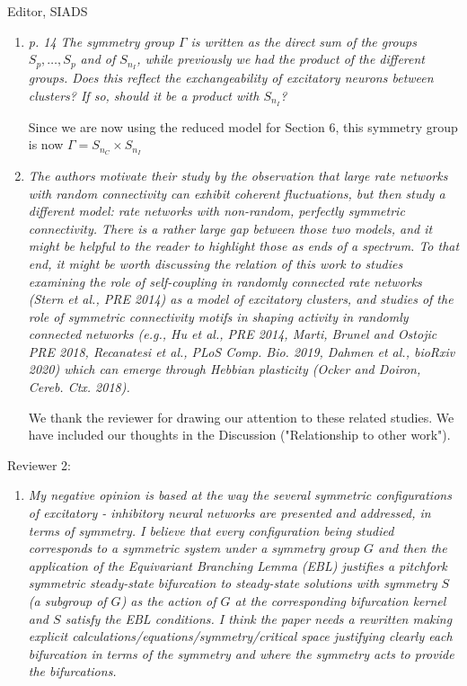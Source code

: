 \documentclass[11pt]{letter}
\begin{document}
\begin{letter}{Editor, SIADS}
\begin{enumerate}
\item \emph{p. 14 The symmetry group $\Gamma$ is written as the direct sum of the groups $S_p, \ldots, S_p$ and of $S_{n_I}$, while previously we had the product of the different groups. Does this reflect the exchangeability of excitatory neurons between clusters? If so, should it be a product with $S_{n_I}$? }

\vspace{4mm} 
Since we are now using the reduced model for Section 6, this symmetry group is now $\Gamma = S_{n_C} \times S_{n_I}$


\item \emph{The authors motivate their study by the observation that large rate networks with random connectivity can exhibit coherent fluctuations, but then study a different model: rate networks with non-random, perfectly symmetric connectivity. There is a rather large gap between those two models, and it might be helpful to the reader to highlight those as ends of a spectrum. To that end, it might be worth discussing the relation of this work to studies examining the role of self-coupling in randomly connected rate networks (Stern et al., PRE 2014) as a model of excitatory clusters, and studies of the role of symmetric connectivity motifs in shaping activity in randomly connected networks (e.g., Hu et al., PRE 2014, Marti, Brunel and Ostojic PRE 2018, Recanatesi et al., PLoS Comp. Bio. 2019, Dahmen et al., bioRxiv 2020) which can emerge through Hebbian plasticity (Ocker and Doiron, Cereb. Ctx. 2018). }

\vspace{4mm} 
We thank the reviewer for drawing our attention to these related studies. We have included our thoughts in the Discussion ("Relationship to other work"). 


\end{enumerate}

Reviewer 2:
\begin{enumerate}
\item \emph{My negative opinion is based at the way the several symmetric configurations of excitatory - inhibitory neural networks are presented and addressed, in terms of symmetry. I believe that every configuration being studied corresponds to a symmetric system under a symmetry group $G$ and then the application of the Equivariant Branching Lemma (EBL) justifies a pitchfork symmetric steady-state bifurcation to steady-state solutions with symmetry $S$ (a subgroup of $G$) as the action of $G$ at the corresponding bifurcation kernel and $S$ satisfy the EBL conditions. I think the paper needs a rewritten making explicit calculations/equations/symmetry/critical space justifying clearly each bifurcation in terms of the symmetry and where the symmetry acts to provide the bifurcations.}
\vspace{4mm} 


\end{enumerate}
\end{letter}
\end{document}
